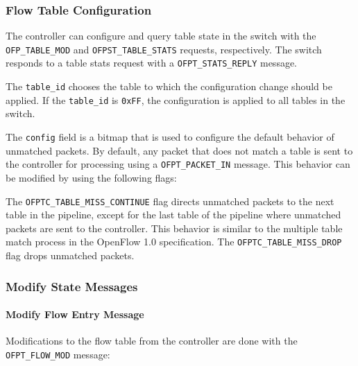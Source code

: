 \subsubsection{Flow Table Configuration}
The controller can configure and query table state in the switch with the \verb|OFP_TABLE_MOD| and \verb|OFPST_TABLE_STATS| requests, respectively. The switch responds to a table stats request with a \verb|OFPT_STATS_REPLY| message.


The \verb|table_id| chooses the table to which the configuration change should be applied. If the \verb|table_id| is \verb|0xFF|, the configuration is applied to all tables in the switch.

The \verb|config| field is a bitmap that is used to configure the default behavior of unmatched packets.  By default, any packet that does not match a table is sent to the controller for processing using a \verb|OFPT_PACKET_IN| message.  This behavior can be modified by using the following flags:


The \verb|OFPTC_TABLE_MISS_CONTINUE| flag directs unmatched packets to the next table in the pipeline, except for the last table of the pipeline where unmatched packets are sent to the controller.  This behavior is similar to the multiple table match process in the OpenFlow 1.0 specification. The \verb|OFPTC_TABLE_MISS_DROP| flag drops unmatched packets.

\subsubsection{Modify State Messages}
\paragraph{Modify Flow Entry Message}
Modifications to the flow table from the controller are done with the \verb|OFPT_FLOW_MOD| message:

